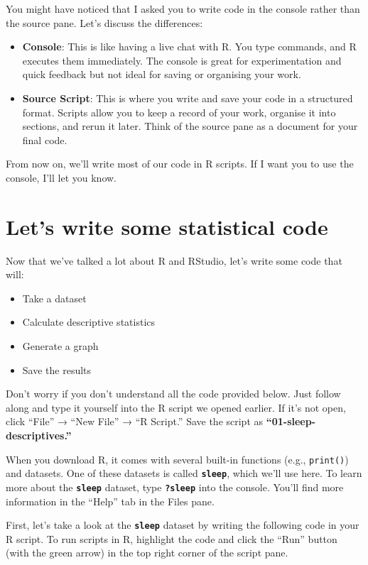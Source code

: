 \documentclass[
]{book}
\begin{document}
You might have noticed that I asked you to write code in the console rather than the source pane. Let's discuss the differences:

\begin{itemize}
\item
  \textbf{Console}: This is like having a live chat with R. You type commands, and R executes them immediately. The console is great for experimentation and quick feedback but not ideal for saving or organising your work.
\item
  \textbf{Source Script}: This is where you write and save your code in a structured format. Scripts allow you to keep a record of your work, organise it into sections, and rerun it later. Think of the source pane as a document for your final code.
\end{itemize}

From now on, we'll write most of our code in R scripts. If I want you to use the console, I'll let you know.

\section{Let's write some statistical code}\label{firstpieceofcode}

Now that we've talked a lot about R and RStudio, let's write some code that will:

\begin{itemize}
\item
  Take a dataset
\item
  Calculate descriptive statistics
\item
  Generate a graph
\item
  Save the results
\end{itemize}

Don't worry if you don't understand all the code provided below. Just follow along and type it yourself into the R script we opened earlier. If it's not open, click ``File'' → ``New File'' → ``R Script.'' Save the script as \textbf{``01-sleep-descriptives.''}

When you download R, it comes with several built-in functions (e.g., \texttt{print()}) and datasets. One of these datasets is called \textbf{\texttt{sleep}}, which we'll use here. To learn more about the \textbf{\texttt{sleep}} dataset, type \textbf{\texttt{?sleep}} into the console. You'll find more information in the ``Help'' tab in the Files pane.

First, let's take a look at the \textbf{\texttt{sleep}} dataset by writing the following code in your R script. To run scripts in R, highlight the code and click the ``Run'' button (with the green arrow) in the top right corner of the script pane.
\end{document}
